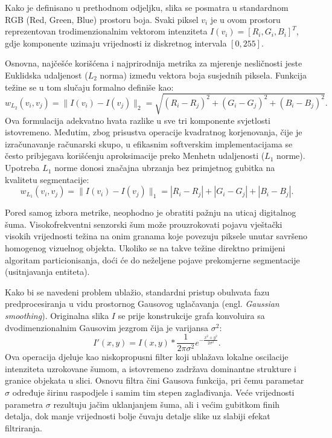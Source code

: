 \documentclass[11pt,a4paper]{article}
\begin{document}
Kako je definisano u prethodnom odjeljku, slika se posmatra u standardnom RGB (Red, Green, Blue) prostoru boja. Svaki piksel $v_i$ je u ovom prostoru reprezentovan trodimenzionalnim vektorom intenziteta $I(v_i) = [R_i, G_i, B_i]^T$, gdje komponente uzimaju vrijednosti iz diskretnog intervala $[0, 255]$. 

Osnovna, najčešće korišćena i najprirodnija metrika za mjerenje nesličnosti jeste Euklidska udaljenost ($L_2$ norma) između vektora boja susjednih piksela. Funkcija težine se u tom slučaju formalno definiše kao:
\begin{equation}
    w_{L_2}(v_i, v_j) = \| I(v_i) - I(v_j) \|_2 = \sqrt{(R_i - R_j)^2 + (G_i - G_j)^2 + (B_i - B_j)^2}.
\end{equation}
Ova formulacija adekvatno hvata razlike u sve tri komponente svjetlosti istovremeno. Međutim, zbog prisustva operacije kvadratnog korjenovanja, čije je izračunavanje računarski skupo, u efikasnim softverskim implementacijama se često pribjegava korišćenju aproksimacije preko Menhetn udaljenosti ($L_1$ norme). Upotreba $L_1$ norme donosi značajna ubrzanja bez primjetnog gubitka na kvalitetu segmentacije:
\begin{equation}
    w_{L_1}(v_i, v_j) = \| I(v_i) - I(v_j) \|_1 = |R_i - R_j| + |G_i - G_j| + |B_i - B_j|.
\end{equation}

Pored samog izbora metrike, neophodno je obratiti pažnju na uticaj digitalnog šuma. Visokofrekventni senzorski šum može prouzrokovati pojavu vještački visokih vrijednosti težina na onim granama koje povezuju piksele unutar savršeno homogenog vizuelnog objekta. Ukoliko se na takve težine direktno primijeni algoritam particionisanja, doći će do neželjene pojave prekomjerne segmentacije (usitnjavanja entiteta).

Kako bi se navedeni problem ublažio, standardni pristup obuhvata fazu predprocesiranja u vidu prostornog Gausovog uglačavanja (engl. \textit{Gaussian smoothing}). Originalna slika $I$ se prije konstrukcije grafa konvoluira sa dvodimenzionalnim Gausovim jezgrom čija je varijansa $\sigma^2$:
\begin{equation}
    I'(x, y) = I(x, y) * \frac{1}{2\pi\sigma^2} e^{-\frac{x^2 + y^2}{2\sigma^2}}.
\end{equation}
Ova operacija djeluje kao niskopropusni filter koji ublažava lokalne oscilacije intenziteta uzrokovane šumom, a istovremeno zadržava dominantne strukture i granice objekata u slici. Osnovu filtra čini Gausova funkcija, pri čemu parametar $\sigma$ određuje širinu raspodjele i samim tim stepen zaglađivanja. Veće vrijednosti parametra $\sigma$ rezultuju jačim uklanjanjem šuma, ali i većim gubitkom finih detalja, dok manje vrijednosti bolje čuvaju detalje slike uz slabiji efekat filtriranja.
\end{document}
